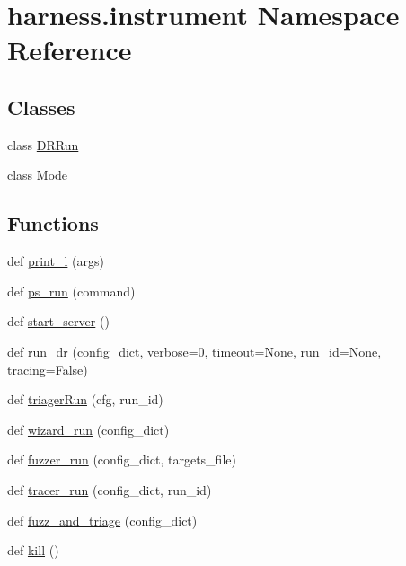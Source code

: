 \hypertarget{namespaceharness_1_1instrument}{}\section{harness.\+instrument Namespace Reference}
\label{namespaceharness_1_1instrument}
\subsection*{Classes}
\begin{DoxyCompactItemize}
\item 
class \mbox{\hyperlink{classharness_1_1instrument_1_1_d_r_run}{D\+R\+Run}}
\item 
class \mbox{\hyperlink{classharness_1_1instrument_1_1_mode}{Mode}}
\end{DoxyCompactItemize}
\subsection*{Functions}
\begin{DoxyCompactItemize}
\item 
def \mbox{\hyperlink{namespaceharness_1_1instrument_aac6f9293f336546e35af93b6d96fc7c4}{print\+\_\+l}} (args)
\item 
def \mbox{\hyperlink{namespaceharness_1_1instrument_a2b147d723167f36660b9082c2bf03e5e}{ps\+\_\+run}} (command)
\item 
def \mbox{\hyperlink{namespaceharness_1_1instrument_adef55a7d4ac78f33cd8b5d58abd85526}{start\+\_\+server}} ()
\item 
def \mbox{\hyperlink{namespaceharness_1_1instrument_a486d30f5beb02c7c2c8ec8c354641e7d}{run\+\_\+dr}} (config\+\_\+dict, verbose=0, timeout=None, run\+\_\+id=None, tracing=False)
\item 
def \mbox{\hyperlink{namespaceharness_1_1instrument_ad576104062a2c6e6f4b91dda2f251ff6}{triager\+Run}} (cfg, run\+\_\+id)
\item 
def \mbox{\hyperlink{namespaceharness_1_1instrument_ac0548bd2e016703207460bfe843d18a0}{wizard\+\_\+run}} (config\+\_\+dict)
\item 
def \mbox{\hyperlink{namespaceharness_1_1instrument_a3eb5109ad7e514685a2ac0f83ca2b0f3}{fuzzer\+\_\+run}} (config\+\_\+dict, targets\+\_\+file)
\item 
def \mbox{\hyperlink{namespaceharness_1_1instrument_a2fcc8f7617315b5c4dbefe413d3c49e4}{tracer\+\_\+run}} (config\+\_\+dict, run\+\_\+id)
\item 
def \mbox{\hyperlink{namespaceharness_1_1instrument_ab4d1c49a240e5857d912c00e526a4167}{fuzz\+\_\+and\+\_\+triage}} (config\+\_\+dict)
\item 
def \mbox{\hyperlink{namespaceharness_1_1instrument_a55e75cb64e281c06b6d8d63d62bae2a4}{kill}} ()
\end{DoxyCompactItemize}
